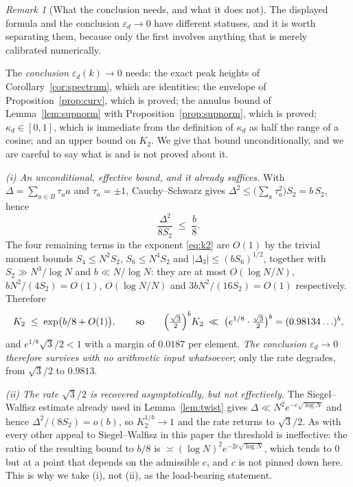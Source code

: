 \documentclass[11pt,a4paper]{article}
\theoremstyle{plain}
\theoremstyle{definition}
\theoremstyle{remark}
\newtheorem{remark}[theorem]{Remark}
\begin{document}
\begin{remark}[What the conclusion needs, and what it does not]\label{rem:whatneeded}
The displayed formula and the conclusion $\varepsilon_d\to0$ have different
statuses, and it is worth separating them, because only the first involves
anything that is merely calibrated numerically.

The \emph{conclusion} $\varepsilon_d(k)\to0$ needs: the
exact peak heights of Corollary~\ref{cor:spectrum}, which are identities; the
envelope of Proposition~\ref{prop:curv}, which is proved; the annulus bound of
Lemma~\ref{lem:supnorm} with Proposition~\ref{prop:supnorm}, which is proved;
$\kappa_d\in[0,1]$, which is immediate from the definition of $\kappa_d$ as half
the range of a cosine; and an upper bound on $K_2$. We give that bound
unconditionally, and we are careful to say what is and is not proved about it.

\emph{(i) An unconditional, effective bound, and it already suffices.} With
$\Delta=\sum_{a\in B}\tau_a a$ and $\tau_a=\pm1$, Cauchy--Schwarz gives
$\Delta^{2}\le\bigl(\sum_a\tau_a^{2}\bigr)S_2=b\,S_2$, hence
\[
  \frac{\Delta^{2}}{8S_2}\;\le\;\frac b8 .
\]
The four remaining terms in the exponent \eqref{eq:k2} are $O(1)$ by the trivial
moment bounds $S_4\le N^{2}S_2$, $S_6\le N^{4}S_2$ and
$|\Delta_3|\le(bS_6)^{1/2}$, together with $S_2\gg N^{3}/\log N$ and
$b\ll N/\log N$: they are at most $O(\log N/N)$, $bN^{2}/(4S_2)=O(1)$,
$O(\log N/N)$ and $3bN^{2}/(16S_2)=O(1)$ respectively. Therefore
\[
  K_2\;\le\;\exp\bigl(b/8+O(1)\bigr),
  \qquad\text{so}\qquad
  \Bigl(\tfrac{\sqrt3}{2}\Bigr)^{b}K_2\;\ll\;\bigl(e^{1/8}\cdot\tfrac{\sqrt3}{2}\bigr)^{b}
  =(0.98134\ldots)^{b},
\]
and $e^{1/8}\sqrt3/2<1$ with a margin of $0.0187$ per element. \emph{The
conclusion $\varepsilon_d\to0$ therefore survives with no arithmetic input
whatsoever}; only the rate degrades, from $\sqrt3/2$ to $0.9813$.

\emph{(ii) The rate $\sqrt3/2$ is recovered asymptotically, but not effectively.}
The Siegel--Walfisz estimate already used in Lemma~\ref{lem:twist} gives
$\Delta\ll N^{2}e^{-c\sqrt{\log N}}$ and hence $\Delta^{2}/(8S_2)=o(b)$, so
$K_2^{1/b}\to1$ and the rate returns to $\sqrt3/2$. As with every other appeal
to Siegel--Walfisz in this paper the threshold is ineffective: the ratio of the
resulting bound to $b/8$ is $\asymp(\log N)^{2}e^{-2c\sqrt{\log N}}$, which
tends to $0$ but at a point that depends on the admissible $c$, and $c$ is not
pinned down here. This is why we take (i), not (ii), as the load-bearing
statement.


\end{remark}
\end{document}
